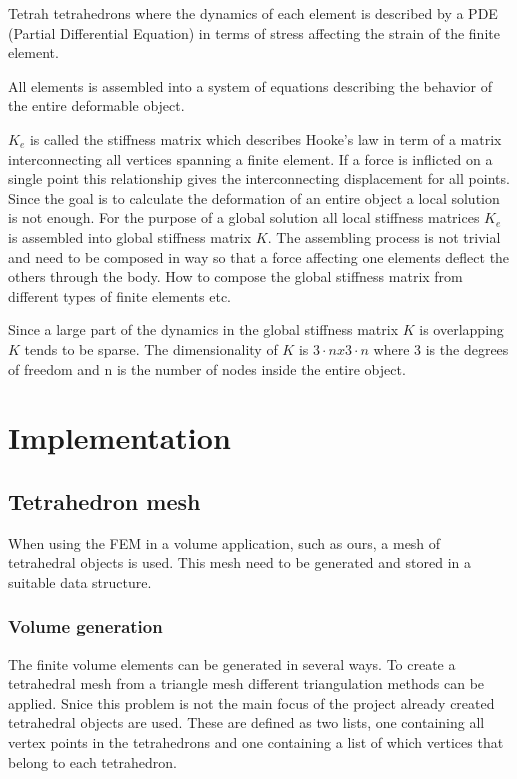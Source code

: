 \documentclass[10pt,a4paper]{article}
\begin{document}
Tetrah tetrahedrons where the dynamics of each element is described by a PDE (Partial Differential Equation) in terms of stress affecting the strain of the finite element.

All elements is assembled into a system of equations describing the behavior of the entire deformable object.

$K_{e}$ is called the stiffness matrix which describes Hooke's law in term of a matrix interconnecting all vertices spanning a finite element. If a force is inflicted on a single point this relationship gives the interconnecting displacement for all points. Since the goal is to calculate the deformation of an entire object a local solution is not enough. For the purpose of a global solution all local stiffness matrices $K_{e}$ is assembled into global stiffness matrix $K$. The assembling process is not trivial and need to be composed in way so that a force affecting one elements deflect the others through the body. How to compose the global stiffness matrix from different types of finite elements etc.

 Since a large part of the dynamics in the global stiffness matrix $K$ is overlapping $K$ tends to be sparse. The dimensionality of $K$ is $3 \cdot n x 3 \cdot n$ where 3 is the degrees of freedom and n is the number of nodes inside the entire object.
\subsection{}
\subsection{}


\section{Implementation}


\subsection{Tetrahedron mesh}
When using the FEM in a volume application, such as ours, a mesh of tetrahedral objects is used. This mesh need to be generated and stored in a suitable data structure.

\subsubsection{Volume generation}
The finite volume elements can be generated in several ways. To create a tetrahedral mesh from a triangle mesh different triangulation methods can be applied. Snice this problem is not the main focus of the project already created tetrahedral objects are used. These are defined as two lists, one containing all vertex points in the tetrahedrons and one containing a list of which vertices that belong to each tetrahedron. 
\end{document}
